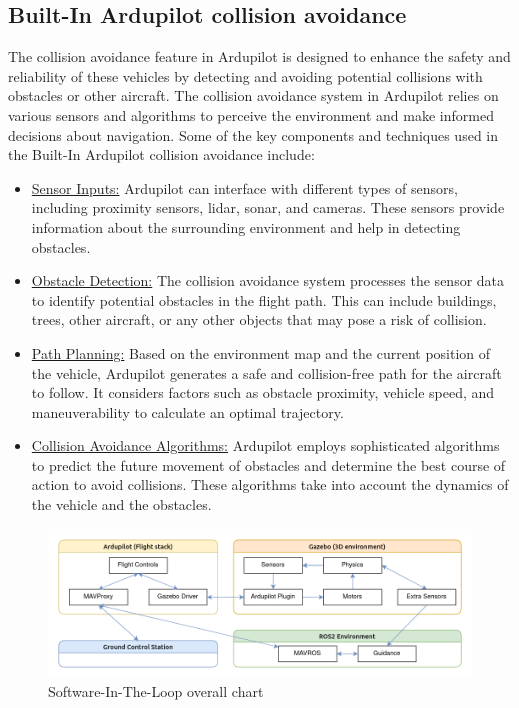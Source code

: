 \subsection{Built-In Ardupilot collision avoidance}
The collision avoidance feature in Ardupilot is designed to enhance the safety and reliability of these vehicles by detecting and avoiding potential collisions with obstacles or other aircraft.
\break
The collision avoidance system in Ardupilot relies on various sensors and algorithms to perceive the environment and make informed decisions about navigation. Some of the key components and techniques used in the Built-In Ardupilot collision avoidance include:

\begin{itemize}
    \item \underline{Sensor Inputs:} Ardupilot can interface with different types of sensors, including proximity sensors, \gls{lidar}, sonar, and cameras. These sensors provide information about the surrounding environment and help in detecting obstacles.
    \item \underline{Obstacle Detection:} The collision avoidance system processes the sensor data to identify potential obstacles in the flight path. This can include buildings, trees, other aircraft, or any other objects that may pose a risk of collision.
    \item \underline{Path Planning:} Based on the environment map and the current position of the vehicle, Ardupilot generates a safe and collision-free path for the aircraft to follow. It considers factors such as obstacle proximity, vehicle speed, and maneuverability to calculate an optimal trajectory.
    \item \underline{Collision Avoidance Algorithms:} Ardupilot employs sophisticated algorithms to predict the future movement of obstacles and determine the best course of action to avoid collisions. These algorithms take into account the dynamics of the vehicle and the obstacles.
\end{itemize}

\begin{figure}[H]
    \centering
    \includegraphics[width=\linewidth]{./projects/ardupilot/sitl_overall.png}
    \caption{Software-In-The-Loop overall chart\cite{sitl_explained}}
\end{figure}

